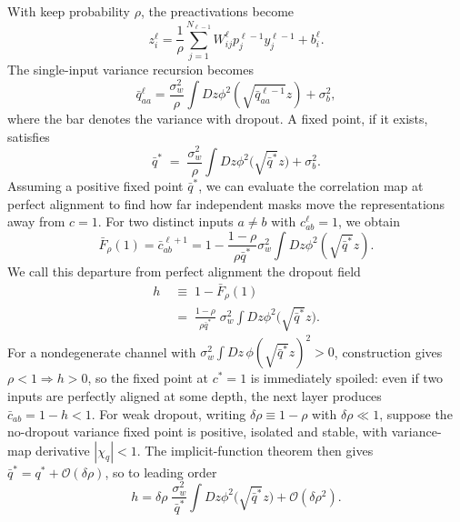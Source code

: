 With keep probability $\rho$, the preactivations become
\begin{equation}
z_i^\ell = \frac{1}{\rho} \sum_{j=1}^{N_{\ell-1}} W_{ij}^\ell p_j^{\ell-1} y_j^{\ell-1} + b_i^\ell.
\end{equation}
The single-input variance recursion becomes
\begin{equation}
\bar{q}_{aa}^{\ell} = \frac{\sigma_{w}^{2}}{\rho} \int Dz \phi^{2}\left( \sqrt{\bar{q}_{aa}^{\ell-1}} z \right) + \sigma_{b}^{2},
\end{equation}
where the bar denotes the variance with dropout. A fixed point, if it exists, satisfies
\begin{equation}
\bar q^{*} \;=\; \frac{\sigma_w^2}{\rho}\int Dz \phi^2\big(\sqrt{\bar q^{*}} z\big) + \sigma_b^2.
\label{eq:qstar-dropout}
\end{equation}
Assuming a positive fixed point $\bar q^*$, we can evaluate the correlation map at perfect alignment to find how far independent masks move the representations away from $c=1$. For two distinct inputs $a\neq b$ with $c^{\ell}_{ab}=1$, we obtain \cite{schoenholz2017deepinformationpropagation}
\begin{equation}
\bar F_\rho(1)= \bar c^{\ell+1}_{ab} = 1 - \frac{1 - \rho}{\rho \bar{q}^{*}} \sigma_{w}^{2} \int Dz \phi^{2}\left( \sqrt{\bar{q}^{*}} z \right).
\end{equation}
We call this departure from perfect alignment the dropout field
\begin{align}
h &\;\equiv\; 1-\bar F_\rho(1)\nonumber\\
&\;=\; \frac{1-\rho}{\rho \bar q^{*}}\; \sigma_w^2\int Dz \phi^2\big(\sqrt{\bar q^{*}} z\big).
\label{eq:Delta_exact}
\end{align}
For a nondegenerate channel with $\sigma_w^2\int Dz\,\phi(\sqrt{\bar q^*}z)^2>0$, construction gives $\rho<1\Rightarrow h>0$,
so the fixed point at $c^*=1$ is immediately spoiled: even if two inputs are perfectly aligned at some depth, the next layer produces $\bar c_{ab}=1-h<1$. For weak dropout, writing $\delta\rho\equiv 1-\rho$ with $\delta\rho\ll 1$, suppose the no-dropout variance fixed point is positive, isolated and stable, with variance-map derivative $|\chi_q|<1$. The implicit-function theorem then gives $\bar q^*=q^*+\mathcal O(\delta\rho)$, so to leading order
\begin{equation}
h = \delta\rho\; \frac{\sigma_w^2}{\bar q^{*}}\int Dz \phi^2\big(\sqrt{\bar q^{*}} z\big) + \mathcal O(\delta\rho^2).
\label{eq:Delta_weakdrop}
\end{equation}

